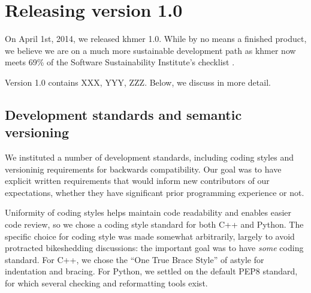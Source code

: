 \documentclass[11pt]{article}
\begin{document}


\section{Releasing version 1.0}

On April 1st, 2014, we released khmer 1.0.  While by no means a finished
product, we believe we are on a much more sustainable development path as khmer
now meets 69\% of the Software Sustainability Institute's checklist
\cite{khmer-1.0-assessment}.

Version 1.0 contains XXX, YYY, ZZZ.
Below, we discuss in more detail.



\subsection{Development standards and semantic versioning}

We instituted a number of development standards, including coding
styles and versioninig requirements for backwards compatibility.  Our
goal was to have explicit written requirements that would inform new
contributors of our expectations, whether they have significant prior
programming experience or not.

Uniformity of coding styles helps maintain code readability and
enables easier code review, so we chose a coding style standard for
both C++ and Python.  The specific choice for coding style was made
somewhat arbitrarily, largely to avoid protracted bikeshedding
discussions: the important goal was to have {\em some} coding
standard.  For C++, we chose the ``One True Brace Style'' of astyle
for indentation and bracing.  For Python, we settled on the default
PEP8 standard, for which several checking and reformatting tools
exist.
\end{document}
